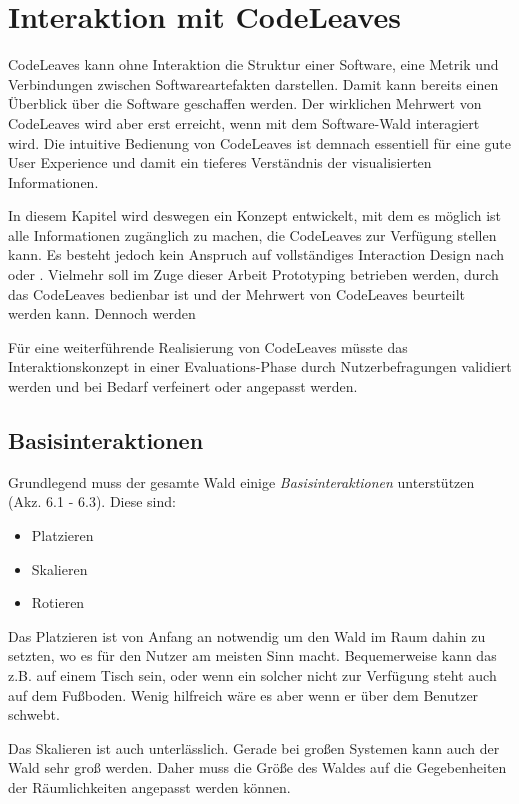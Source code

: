 \chapter{Interaktion mit CodeLeaves}
\label{ch:interaction}

CodeLeaves kann ohne Interaktion die Struktur einer Software, eine Metrik und Verbindungen zwischen Softwareartefakten darstellen. Damit kann bereits einen Überblick über die Software geschaffen werden. Der wirklichen Mehrwert von CodeLeaves wird aber erst erreicht, wenn mit dem Software-Wald interagiert wird. Die intuitive Bedienung von CodeLeaves ist demnach essentiell für eine gute User Experience und damit ein tieferes Verständnis der visualisierten Informationen.

In diesem Kapitel wird deswegen ein Konzept entwickelt, mit dem es möglich ist alle Informationen zugänglich zu machen, die CodeLeaves zur Verfügung stellen kann. Es besteht jedoch kein Anspruch auf vollständiges Interaction Design nach \cite{goodwin2011designing} oder \cite{cooper2014face}. Vielmehr soll im Zuge dieser Arbeit Prototyping betrieben werden, durch das CodeLeaves bedienbar ist und der Mehrwert von CodeLeaves beurteilt werden kann. Dennoch werden 

Für eine weiterführende Realisierung von CodeLeaves müsste das Interaktionskonzept in einer Evaluations-Phase durch Nutzerbefragungen validiert werden und bei Bedarf verfeinert oder angepasst werden.

\section{Basisinteraktionen}
Grundlegend muss der gesamte Wald einige \textit{Basisinteraktionen} unterstützen (Akz. 6.1 - 6.3). Diese sind:

\begin{itemize}
  \item Platzieren
  \item Skalieren
  \item Rotieren
\end{itemize}

Das Platzieren ist von Anfang an notwendig um den Wald im Raum dahin zu setzten, wo es für den Nutzer am meisten Sinn macht. Bequemerweise kann das z.B. auf einem Tisch sein, oder wenn ein solcher nicht zur Verfügung steht auch auf dem Fußboden. Wenig hilfreich wäre es aber wenn er über dem Benutzer schwebt.

Das Skalieren ist auch unterlässlich. Gerade bei großen Systemen kann auch der Wald sehr groß werden. Daher muss die Größe des Waldes auf die Gegebenheiten der Räumlichkeiten angepasst werden können.

